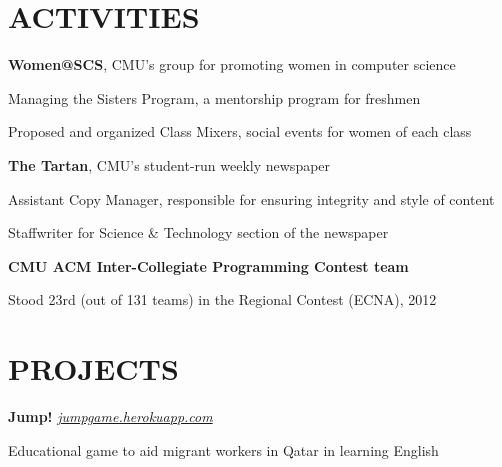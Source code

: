 \documentclass[margin, 11pt]{res} %
\begin{document}
\begin{resume}
\section{ACTIVITIES}

{\bf Women@SCS}, CMU's group for promoting women in computer science

\begin{itemize} \itemsep -2pt
{\small \item Managing the Sisters Program, a mentorship program for freshmen
\item Proposed and organized Class Mixers, social events for women of each class}
\end{itemize}

\vspace{3pt}

{\bf The Tartan}, CMU's student-run weekly newspaper

\begin{itemize} \itemsep -2pt
{\small \item Assistant Copy Manager, responsible for ensuring integrity and style of content
\item Staffwriter for Science \& Technology section of the newspaper}
\end{itemize}

\vspace{3pt}

{\bf CMU ACM Inter-Collegiate Programming Contest team}
\begin{itemize} \itemsep -2pt
{\small \item Stood 23rd (out of 131 teams) in the Regional Contest (ECNA), 2012}
\end{itemize}

\section{PROJECTS}

{\bf Jump!} \href{http://jumpgame.herokuapp.com/}{\sl jumpgame.herokuapp.com}

\begin{itemize} \itemsep -2pt
{\small \item Educational game to aid migrant workers in Qatar in learning English}
\end{itemize}

\vspace{3pt}


\end{resume}
\end{document}
